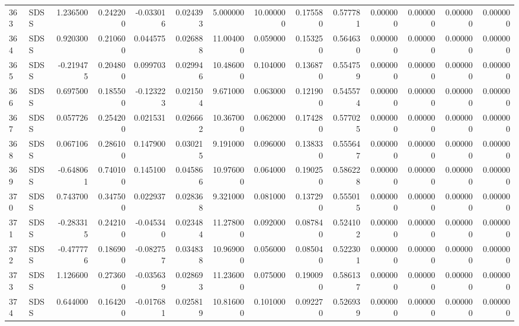\begin{tabular}{llrrrrrrrrrrrr}
363 &   SDSS &  1.236500 &      0.242200 & -0.033016 &    0.024393 &   5.000000 &     10.000000 &   0.175580 &  0.577781 &  0.000000 &   0.000000 &     0.000000 &     0.000000 \\
364 &   SDSS &  0.920300 &      0.210600 &  0.044575 &    0.026888 &  11.004000 &      0.059000 &   0.153250 &  0.564630 &  0.000000 &   0.000000 &     0.000000 &     0.000000 \\
365 &   SDSS & -0.219475 &      0.204800 &  0.099703 &    0.029946 &  10.486000 &      0.104000 &   0.136870 &  0.554759 &  0.000000 &   0.000000 &     0.000000 &     0.000000 \\
366 &   SDSS &  0.697500 &      0.185500 & -0.123223 &    0.021504 &   9.671000 &      0.063000 &   0.121900 &  0.545574 &  0.000000 &   0.000000 &     0.000000 &     0.000000 \\
367 &   SDSS &  0.057726 &      0.254200 &  0.021531 &    0.026662 &  10.367000 &      0.062000 &   0.174280 &  0.577025 &  0.000000 &   0.000000 &     0.000000 &     0.000000 \\
368 &   SDSS &  0.067106 &      0.286100 &  0.147900 &    0.030215 &   9.191000 &      0.096000 &   0.138330 &  0.555647 &  0.000000 &   0.000000 &     0.000000 &     0.000000 \\
369 &   SDSS & -0.648061 &      0.740100 &  0.145100 &    0.045866 &  10.976000 &      0.064000 &   0.190250 &  0.586228 &  0.000000 &   0.000000 &     0.000000 &     0.000000 \\
370 &   SDSS &  0.743700 &      0.347500 &  0.022937 &    0.028368 &   9.321000 &      0.081000 &   0.137290 &  0.555015 &  0.000000 &   0.000000 &     0.000000 &     0.000000 \\
371 &   SDSS & -0.283315 &      0.242100 & -0.045340 &    0.023484 &  11.278000 &      0.092000 &   0.087840 &  0.524102 &  0.000000 &   0.000000 &     0.000000 &     0.000000 \\
372 &   SDSS & -0.477776 &      0.186900 & -0.082757 &    0.034838 &  10.969000 &      0.056000 &   0.085040 &  0.522301 &  0.000000 &   0.000000 &     0.000000 &     0.000000 \\
373 &   SDSS &  1.126600 &      0.273600 & -0.035639 &    0.028693 &  11.236000 &      0.075000 &   0.190090 &  0.586137 &  0.000000 &   0.000000 &     0.000000 &     0.000000 \\
374 &   SDSS &  0.644000 &      0.164200 & -0.017681 &    0.025819 &  10.816000 &      0.101000 &   0.092270 &  0.526939 &  0.000000 &   0.000000 &     0.000000 &     0.000000 \\

\end{tabular}
